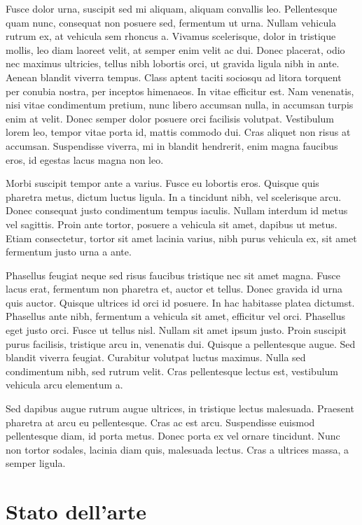 \documentclass[target=bach,aauheader=,style=]{thud}
\begin{document}
Fusce dolor urna, suscipit sed mi aliquam, aliquam convallis leo. Pellentesque quam nunc, consequat non posuere sed, fermentum ut urna. Nullam vehicula rutrum ex, at vehicula sem rhoncus a. Vivamus scelerisque, dolor in tristique mollis, leo diam laoreet velit, at semper enim velit ac dui. Donec placerat, odio nec maximus ultricies, tellus nibh lobortis orci, ut gravida ligula nibh in ante. Aenean blandit viverra tempus. Class aptent taciti sociosqu ad litora torquent per conubia nostra, per inceptos himenaeos. In vitae efficitur est. Nam venenatis, nisi vitae condimentum pretium, nunc libero accumsan nulla, in accumsan turpis enim at velit. Donec semper dolor posuere orci facilisis volutpat. Vestibulum lorem leo, tempor vitae porta id, mattis commodo dui. Cras aliquet non risus at accumsan. Suspendisse viverra, mi in blandit hendrerit, enim magna faucibus eros, id egestas lacus magna non leo.

Morbi suscipit tempor ante a varius. Fusce eu lobortis eros. Quisque quis pharetra metus, dictum luctus ligula. In a tincidunt nibh, vel scelerisque arcu. Donec consequat justo condimentum tempus iaculis. Nullam interdum id metus vel sagittis. Proin ante tortor, posuere a vehicula sit amet, dapibus ut metus. Etiam consectetur, tortor sit amet lacinia varius, nibh purus vehicula ex, sit amet fermentum justo urna a ante.

Phasellus feugiat neque sed risus faucibus tristique nec sit amet magna. Fusce lacus erat, fermentum non pharetra et, auctor et tellus. Donec gravida id urna quis auctor. Quisque ultrices id orci id posuere. In hac habitasse platea dictumst. Phasellus ante nibh, fermentum a vehicula sit amet, efficitur vel orci. Phasellus eget justo orci. Fusce ut tellus nisl. Nullam sit amet ipsum justo. Proin suscipit purus facilisis, tristique arcu in, venenatis dui. Quisque a pellentesque augue. Sed blandit viverra feugiat. Curabitur volutpat luctus maximus. Nulla sed condimentum nibh, sed rutrum velit. Cras pellentesque lectus est, vestibulum vehicula arcu elementum a.

Sed dapibus augue rutrum augue ultrices, in tristique lectus malesuada. Praesent pharetra at arcu eu pellentesque. Cras ac est arcu. Suspendisse euismod pellentesque diam, id porta metus. Donec porta ex vel ornare tincidunt. Nunc non tortor sodales, lacinia diam quis, malesuada lectus. Cras a ultrices massa, a semper ligula.

\chapter{Stato dell'arte}
\label{art}
\end{document}
